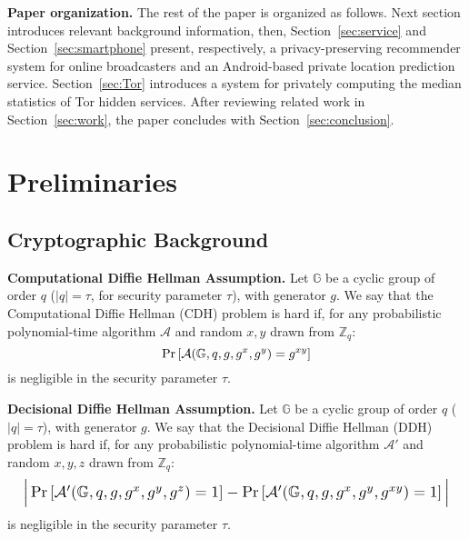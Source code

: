 \documentclass[conference]{IEEEtran}
\newcommand{\descr}[1]{\medskip \noindent \textbf{#1}}
\begin{document}
\descr{Paper organization.} The rest of the paper is organized as follows.
Next section introduces relevant background information, then, 
Section~\ref{sec:service} and Section~\ref{sec:smartphone} present, respectively, a privacy-preserving recommender system for online broadcasters and an Android-based private location prediction service. Section~\ref{sec:Tor} introduces a system for privately computing the median statistics of Tor hidden services.
After reviewing related work in Section~\ref{sec:work}, the paper concludes with Section~\ref{sec:conclusion}. 
 



\section{Preliminaries}
\label{sec:preliminaries}


\subsection{Cryptographic Background}
\label{sec:crypto}



\descr{Computational Diffie Hellman Assumption.}
Let $\mathbb{G}$ be a cyclic group of order $q$ ($\vert q \vert = \tau$, for  security parameter $\tau$), with generator $g$.
We say that the Computational Diffie Hellman (CDH) problem is hard if, for any probabilistic polynomial-time algorithm $\mathcal{A}$ and random $x , y$ drawn from $\mathbb{Z}_q$: \vspace{-0.08cm}
\begin{equation*}
\Pr \left[ \mathcal{A} ( \mathbb{G} , q , g, g^x , g^y ) = g^{xy} \right] \vspace{-0.08cm}
\end{equation*}
is negligible in the security parameter $\tau$.


\descr{Decisional Diffie Hellman Assumption.}
Let $\mathbb{G}$ be a cyclic group of order $q$ ($\vert q \vert = \tau$), with generator $g$.
We say that the Decisional Diffie Hellman (DDH) problem is hard if, for any probabilistic polynomial-time algorithm $\mathcal{A'}$ and random $x , y, z$ drawn from $\mathbb{Z}_q$: \vspace{-0.08cm}
\begin{equation*}
\resizebox{\columnwidth}{!}{
$\Big\vert \Pr \left[ \mathcal{A'} ( \mathbb{G} , q , g, g^x , g^y , g^z ) = 1 \right] - 
\Pr \left[ \mathcal{A'}( \mathbb{G},q,g,g^x,g^y, g^{x y} ) = 1 \right] \Big\vert$ \vspace{-0.08cm}
}
\end{equation*}
is negligible in the security parameter $\tau$.
\end{document}
